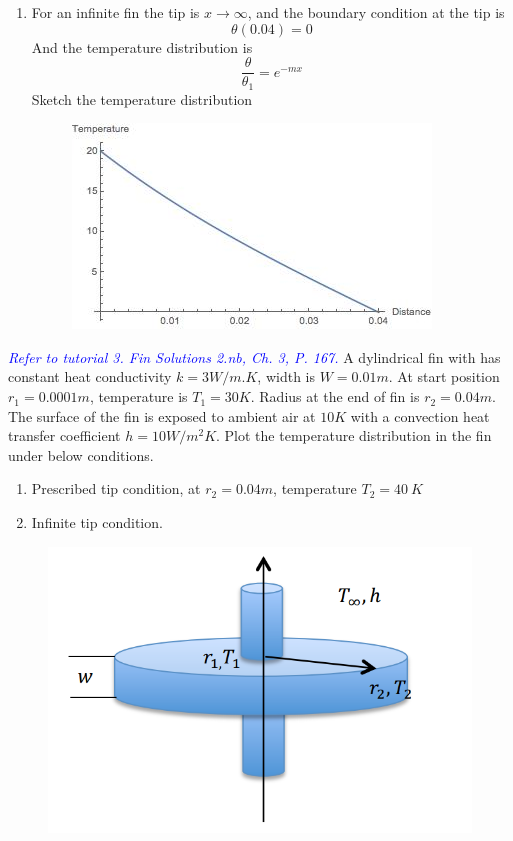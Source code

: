 \begin{solution}
\begin{enumerate}
\begin{figure}[h!]
\end{figure}
\item
For an infinite fin the tip is  $x\to\infty$, and the boundary condition at the tip is 
$$\theta(0.04)=0$$
And the temperature distribution is 
$$\frac{\theta}{\theta_1}=e^{-mx}$$
Sketch the temperature distribution
\begin{figure}[h!]
  \centering
    \includegraphics[scale=0.6]{figures/ch2/15}
\end{figure}

\end{enumerate}
\end{solution}


\begin{example}
\textcolor{blue} {\emph{Refer to tutorial 3.  Fin Solutions 2.nb, Ch. 3, P. 167.}}
A dylindrical fin with has constant heat conductivity  $k=3W/m.K$, width is
$W=0.01m$. At start position $r_1=0.0001m$, temperature is $T_1=30K$. Radius at
the end of fin is $r_2=0.04m$. The surface of the fin is exposed to ambient air at
$10K$ with a convection heat transfer coefficient $h=10W/m^2K$. Plot the temperature distribution in the fin under below conditions.

\begin{enumerate}
\item Prescribed tip condition, at $r_2=0.04m$, temperature $T_2=40~K$
\item Infinite tip condition.
\end{enumerate}
\begin{figure}[h!]
  \centering
    \includegraphics[scale=0.6]{figures/ch2/16}
\end{figure}
\end{example}

